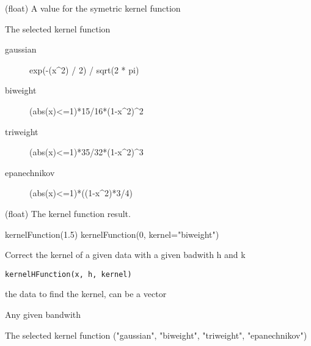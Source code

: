 \documentclass[letterpaper]{book}
\begin{document}
\begin{Arguments}
\begin{ldescription}
\item[\code{x}] (float) A value for the symetric kernel function

\item[\code{kernel}] The selected kernel function

\begin{description}

\item[gaussian] exp(-(x\textasciicircum{}2) / 2) / sqrt(2 * pi)
\item[biweight] (abs(x)<=1)*15/16*(1-x\textasciicircum{}2)\textasciicircum{}2
\item[triweight] (abs(x)<=1)*35/32*(1-x\textasciicircum{}2)\textasciicircum{}3
\item[epanechnikov] (abs(x)<=1)*((1-x\textasciicircum{}2)*3/4)

\end{description}

\end{ldescription}
\end{Arguments}
%
\begin{Value}
(float) The kernel function result.
\end{Value}
%
\begin{Examples}
\begin{ExampleCode}
kernelFunction(1.5)
          kernelFunction(0, kernel="biweight")

\end{ExampleCode}
\end{Examples}
%
\begin{Description}\relax
Correct the kernel of a given data with a given badwith h and k
\end{Description}
%
\begin{Usage}
\begin{verbatim}
kernelHFunction(x, h, kernel)
\end{verbatim}
\end{Usage}
%
\begin{Arguments}
\begin{ldescription}
\item[\code{x}] the data to find the kernel, can be a vector

\item[\code{h}] Any given bandwith

\item[\code{kernel}] The selected kernel function ("gaussian", "biweight", "triweight", "epanechnikov")
\end{ldescription}
\end{Arguments}
\end{document}
